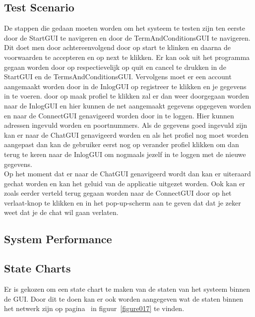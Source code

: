 \documentclass[12pt]{article}
\begin{document}
\subsection{Test Scenario}
De stappen die gedaan moeten worden om het systeem te testen zijn ten eerste door de StartGUI te navigeren en door de TermAndConditionsGUI te navigeren. Dit doet men door achtereenvolgend door op start te klinken en daarna de voorwaarden te accepteren en op next te klikken. Er kan ook uit het programma gegaan worden door op respectievelijk op quit en cancel te drukken in de StartGUI en de TermsAndConditionsGUI. Vervolgens moet er een account aangemaakt worden door in de InlogGUI op registreer te klikken en je gegevens in te voeren. door op maak profiel te klikken zal er dan weer doorgegaan worden naar de InlogGUI en hier kunnen de net aangemaakt gegevens opgegeven worden en naar de ConnectGUI genavigeerd worden door in te loggen. Hier kunnen adressen ingevuld worden en poortnummers. Als de gegevens goed ingevuld zijn kan er naar de ChatGUI genavigeerd worden en als het profiel nog moet worden aangepast dan kan de gebruiker eerst nog op verander profiel klikken om dan terug te keren naar de InlogGUI om nogmaals jezelf in te loggen met de nieuwe gegevens. \\

\noindent Op het moment dat er naar de ChatGUI genavigeerd wordt dan kan er uiteraard gechat worden en kan het geluid van de applicatie uitgezet worden. Ook kan er zoals eerder verteld terug gegaan worden naar de ConnectGUI door op het verlaat-knop te klikken en in het pop-up-scherm aan te geven dat dat je zeker weet dat je de chat wil gaan verlaten.

\subsection{System Performance}


\subsection{State Charts}
Er is gekozen om een state chart te maken van de staten van het systeem binnen de GUI. Door dit te doen kan er ook worden aangegeven wat de staten binnen het netwerk zijn op pagina~\pageref{figure017} in figuur~\ref{figure017} te vinden.
\end{document}
